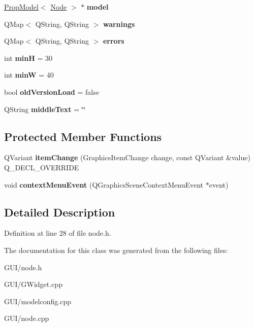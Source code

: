 \begin{DoxyCompactItemize}
\hyperlink{class_prop_model}{Prop\+Model}$<$ \hyperlink{class_node}{Node} $>$ $\ast$ {\bfseries model}
\item 
\mbox{\label{class_node_ae4143b3ef5ddef1934c4ac0bd3478c4c}} 
Q\+Map$<$ Q\+String, Q\+String $>$ {\bfseries warnings}
\item 
\mbox{\label{class_node_aa8380985ec20abc4f8c925f3c45001ac}} 
Q\+Map$<$ Q\+String, Q\+String $>$ {\bfseries errors}
\item 
\mbox{\label{class_node_ada48cdb657f8a15862e1f455e40f3668}} 
int {\bfseries minH} = 30
\item 
\mbox{\label{class_node_a5f16069a428af9af9540eeb5d2bb5bac}} 
int {\bfseries minW} = 40
\item 
\mbox{\label{class_node_a705fa440b0f0d9c84559e6ef5193654a}} 
bool {\bfseries old\+Version\+Load} = false
\item 
\mbox{\label{class_node_a55d59a6f2e2cd8ebcfefe9d678e0b56d}} 
Q\+String {\bfseries middle\+Text} = \char`\"{}\char`\"{}
\end{DoxyCompactItemize}
\subsection*{Protected Member Functions}
\begin{DoxyCompactItemize}
\item 
\mbox{\label{class_node_a5030285fe1ef2188dbe6b3d7a5a1b6c2}} 
Q\+Variant {\bfseries item\+Change} (Graphics\+Item\+Change change, const Q\+Variant \&value) Q\+\_\+\+D\+E\+C\+L\+\_\+\+O\+V\+E\+R\+R\+I\+DE
\item 
\mbox{\label{class_node_abbacd4d6a5e9acb8d013817c585b482e}} 
void {\bfseries context\+Menu\+Event} (Q\+Graphics\+Scene\+Context\+Menu\+Event $\ast$event)
\end{DoxyCompactItemize}


\subsection{Detailed Description}


Definition at line 28 of file node.\+h.



The documentation for this class was generated from the following files\+:\begin{DoxyCompactItemize}
\item 
G\+U\+I/node.\+h\item 
G\+U\+I/G\+Widget.\+cpp\item 
G\+U\+I/modelconfig.\+cpp\item 
G\+U\+I/node.\+cpp\end{DoxyCompactItemize}
